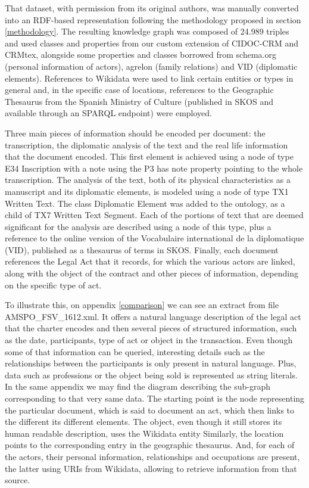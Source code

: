 \documentclass{article}
\begin{document}
That dataset, with permission from its original authors, was manually converted into an RDF-based representation following the methodology proposed in section \ref{methodology}.
The resulting knowledge graph was composed of 24.989 triples and used classes and properties from our custom extension of CIDOC-CRM and CRMtex, alongside some properties and classes borrowed from schema.org (personal information of actors)\cite{guha2016schema}, agrelon (family relations)\cite{litz2012agrelon} and VID (diplomatic elements). References to Wikidata were used to link certain entities or types in general and, in the specific case of locations, references to the Geographic Thesaurus from the Spanish Ministry of Culture (published in SKOS and available through an SPARQL endpoint) were employed.

Three main pieces of information should be encoded per document: the transcription, the diplomatic analysis of the text and the real life information that the document encoded.
This first element is achieved using a node of type E34 Inscription with a note using the P3 has note property pointing to the whole transcription.
The analysis of the text, both of its physical characteristics as a manuscript and its diplomatic elements, is modeled using a node of type TX1 Written Text.
The class Diplomatic Element was added to the ontology, as a child of TX7 Written Text Segment.
Each of the portions of text that are deemed significant for the analysis are described using a node of this type, plus a reference to the online version of the Vocabulaire international de la diplomatique (VID), published as a thesaurus of terms in SKOS.
Finally, each document references the Legal Act that it records, for which the various actors are linked, along with the object of the contract and other pieces of information, depending on the specific type of act.

To illustrate this, on appendix \ref{comparison} we can see an extract from file AMSPO\_FSV\_1612.xml.
It offers a natural language description of the legal act that the charter encodes and then several pieces of structured information, such as the date, participants, type of act or object in the transaction.
Even though some of that information can be queried, interesting details such as the relationships between the participants is only present in natural language.
Plus, data such as professions or the object being sold is represented as string literals.
In the same appendix we may find the diagram describing the sub-graph corresponding to that very same data.
The starting point is the node representing the particular document, which is said to document an act, which then links to the different its different elements.
The object, even though it still stores its human readable description, uses the Wikidata entity 
Similarly, the location points to the corresponding entry in the geographic thesaurus.
And, for each of the actors, their personal information, relationships and occupations are present, the latter using URIs from Wikidata, allowing to retrieve information from that source.
\end{document}
